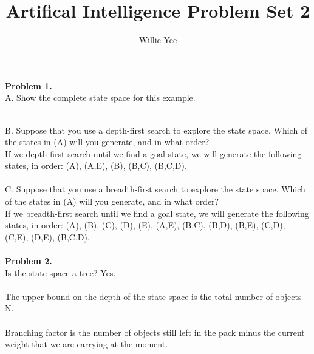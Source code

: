 \documentclass{article}
\begin{document}
\title{Artifical Intelligence Problem Set 2}
\date{}
\author{Willie Yee}
\maketitle
\noindent
\textbf{Problem 1.}\\
A. Show the complete state space for this example.\\
\\
B. Suppose that you use a depth-first search to explore the state space. Which of the states in (A) will you generate, and in what order?\\
If we depth-first search until we find a goal state, we will generate the following states, in order: (A), (A,E), (B), (B,C), (B,C,D).\\
\\
C. Suppose that you use a breadth-first search to explore the state space. Which of the states in (A) will you generate, and in what order?\\
If we breadth-first search until we find a goal state, we will generate the following states, in order: (A), (B), (C), (D), (E), (A,E), (B,C), (B,D), (B,E), (C,D), (C,E), (D,E), (B,C,D).\\\\
\textbf{Problem 2.}\\
Is the state space a tree? Yes.\\
\\
The upper bound on the depth of the state space is the total number of objects N.\\
\\
Branching factor is the number of objects still left in the pack minus the current weight that we are carrying at the moment.\\
\end{document}
